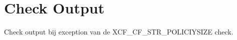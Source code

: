 \section{Check Output}
\label{sec:Check Output}

Check output bij exception van de XCF\_CF\_STR\_POLICIYSIZE check.



